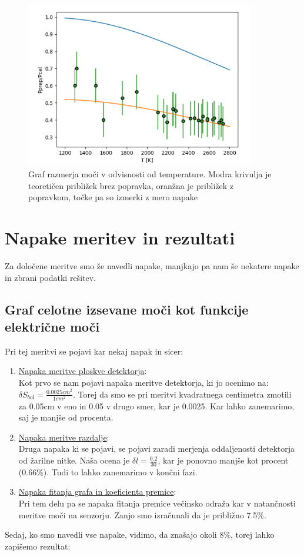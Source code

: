 \documentclass[11pt, a4paper]{article}
\theoremstyle{definition}
\theoremstyle{example}
\theoremstyle{izrek}
\begin{document}
\begin{figure}[H]
	\centering
    \includegraphics[width=10cm]{Graf,Silicij.png}
    \caption{Graf razmerja moči v odvisnosti od temperature. Modra krivulja je
teoretičen približek brez popravka, oranžna je približek z popravkom, točke
pa so izmerki z mero napake}
\end{figure}

\pagebreak
\section{Napake meritev in rezultati}
Za določene meritve smo že navedli napake, manjkajo pa nam še nekatere napake in zbrani podatki rešitev.
\subsection{Graf celotne izsevane moči kot funkcije električne moči}

Pri tej meritvi se pojavi kar nekaj napak in sicer:
\begin{enumerate}
\item \underline{Napaka meritve ploskve detektorja}: \\
Kot prvo se nam pojavi napaka meritve detektorja, ki jo ocenimo na: $\delta S_{bol}=\frac{0.0025{cm}^2}{1{cm}^2}$. Torej da smo se pri meritvi kvadratnega centimetra zmotili za 0.05cm v eno in 0.05 v drugo smer, kar je 0.0025.
Kar lahko zanemarimo, saj je manjše od procenta. 
\item \underline{Napaka meritve razdalje}:\\
Druga napaka ki se pojavi, se pojavi zaradi merjenja oddaljenosti detektorja od žarilne nitke. Naša ocena je $\delta l=\frac{0.2}{30}$, kar je ponovno manjše kot procent (0.66\%).
Tudi to lahko zanemarimo v končni fazi.
\item \underline{Napaka fitanja grafa in koeficienta premice}:  \\
Pri tem delu pa se napaka fitanja premice večinsko odraža kar v natančnosti meritve moči na senzorju.
Zanjo smo izračunali da je približno 7.5\%.
\end{enumerate}
Sedaj, ko smo navedli vse napake, vidimo, da znašajo okoli 8\%, torej lahko zapišemo rezultat:
\end{document}
